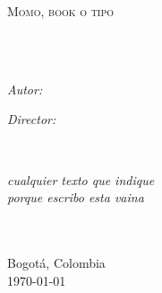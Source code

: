 \documentclass[11pt,spanish, singlespacing,headsepline,
]{MastersDoctoralThesis}
\author{Juan C. \textsc{Gallego}} %
\begin{document}
\frontmatter %

\pagestyle{plain} %


\begin{titlepage}
\begin{center}

\vspace*{.06\textheight}
{\scshape\LARGE \univname\par}\vspace{1.5cm} %
\textsc{\Large Momo, book o tipo}\\[0.5cm] %

\HRule \\[0.4cm] %
{\huge \bfseries \ttitle\par}\vspace{0.4cm} %
\HRule \\[1.5cm] %
 
\begin{minipage}[t]{0.4\textwidth}
\begin{flushleft} \large
\emph{Autor:}\\
\href{mailto:jc.gallego10@uniandes.edu.co}{\authorname} %
\end{flushleft}
\end{minipage}
\begin{minipage}[t]{0.4\textwidth}
\begin{flushright} \large
\emph{Director:} \\
\href{www.thisisnothing.com}{\supname} %
\end{flushright}
\end{minipage}\\[3cm]
 
\vfill

\large \textit{cualquier texto que indique \\ porque escribo esta vaina}\\[0.7cm] %
\deptname\\\facname\\[2cm] %
 
\vfill

Bogotá, Colombia\\
{\large \today}\\[4cm] %
 
\vfill
\end{center}
\end{titlepage}
\end{document}
